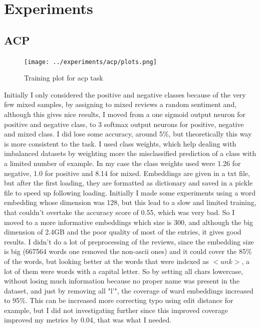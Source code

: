 \documentclass{article}
\begin{document}
    \section{Experiments}\label{sec:s4}
        \subsection{ACP}\label{subsec:s1}
            \begin{figure}
                \texttt{[image: ../experiments/acp/plots.png]}
                \caption{Training plot for acp task}
                \label{fig:train-acp}
            \end{figure}
            Initially I only considered the positive and negative classes because of the very few mixed samples, by assigning to mixed reviews a random sentiment and, although this gives nice results, I moved from a one sigmoid output neuron for positive and negative class, to 3 softmax output neurons for positive, negative and mixed class.
            I did lose some accuracy, around 5\%, but theoretically this way is more consistent to the task.
            I used class weights, which help dealing with imbalanced datasets by weighting more the misclassified prediction of a class with a limited number of example.
            In my case the class weights used were 1.26 for negative, 1.0 for positive and 8.14 for mixed.
            Embeddings are given in a txt file, but after the first loading, they are formatted as dictionary and saved in a pickle file to speed up following loading.
            Initially I made some experiments using a word embedding whose dimension was 128, but this lead to a slow and limited training, that couldn't overtake the accuracy score of 0.55, which was very bad.
            So I moved to a more informative embeddings which size is 300, and although the big dimension of 2.4GB and the poor quality of most of the entries, it gives good results.
            I didn't do a lot of preprocessing of the reviews, since the embedding size is big (667564 words one removed the non-ascii ones) and it could cover the 85\% of the words, but looking better at the words that were indexed as $<unk>$, a lot of them were words with a capital letter.
            So by setting all chars lowercase, without losing much information because no proper name was present in the dataset, and just by removing all "l'", the coverage of ward embeddings increased to 95\%.
            This can be increased more correcting typo using edit distance for example, but I did not investigating further since this improved coverage improved my metrics by 0.04, that was what I needed.
\end{document}

